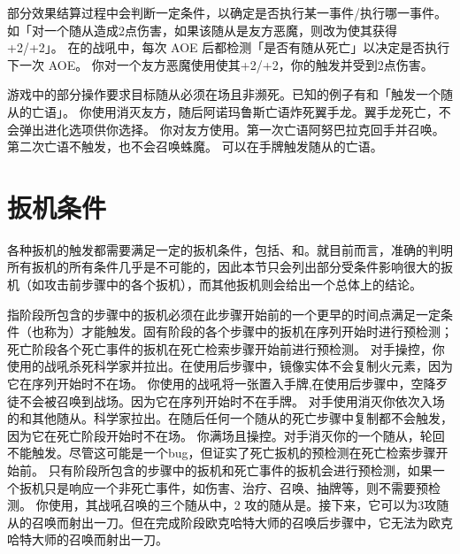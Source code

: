 部分效果结算过程中会判断一定条件，以确定是否执行某一事件/执行哪一事件。如「对一个随从造成2点伤害，如果该随从是友方恶魔，则改为使其获得+2/+2」。
\example 在的战吼中，每次 AOE 后都检测「是否有随从死亡」以决定是否执行下一次 AOE。
\example 你对一个友方恶魔使用使其+2/+2，你的触发并受到2点伤害。

游戏中的部分操作要求目标随从必须在场且非濒死。已知的例子有和「触发一个随从的亡语」。
\example 你使用消灭友方，随后阿诺玛鲁斯亡语炸死翼手龙。翼手龙死亡，不会弹出进化选项供你选择。
\example 你对友方使用。第一次亡语阿努巴拉克回手并召唤。第二次亡语不触发，也不会召唤蛛魔。
\exception {}可以在手牌触发随从的亡语。

\section{扳机条件}
\label{trigger-cond}

各种扳机的触发都需要满足一定的扳机条件，包括、和。就目前而言，准确的判明所有扳机的所有条件几乎是不可能的，因此本节只会列出部分受条件影响很大的扳机（如攻击前步骤中的各个扳机），而其他扳机则会给出一个总体上的结论。

指阶段所包含的步骤中的扳机必须在此步骤开始前的一个更早的时间点满足一定条件（也称为）才能触发。固有阶段的各个步骤中的扳机在序列开始时进行预检测；死亡阶段各个死亡事件的扳机在死亡检索步骤开始前进行预检测。
\example 对手操控，你使用的战吼杀死科学家并拉出。在使用后步骤中，镜像实体不会复制火元素，因为它在序列开始时不在场。
\example 你使用的战吼将一张置入手牌,在使用后步骤中，空降歹徒不会被召唤到战场。因为它在序列开始时不在手牌。
\example 对手使用消灭你依次入场的和其他随从。科学家拉出。在随后任何一个随从的死亡步骤中复制都不会触发，因为它在死亡阶段开始时不在场。
\example 你满场且操控。对手消灭你的一个随从，轮回不能触发。尽管这可能是一个bug，但证实了死亡扳机的预检测在死亡检索步骤开始前。
\notice 只有阶段所包含的步骤中的扳机和死亡事件的扳机会进行预检测，如果一个扳机只是响应一个非死亡事件，如伤害、治疗、召唤、抽牌等，则不需要预检测。
\example 你使用，其战吼召唤的三个随从中，2 攻的随从是。接下来，它可以为3攻随从的召唤而射出一刀。但在完成阶段欧克哈特大师的召唤后步骤中，它无法为欧克哈特大师的召唤而射出一刀。

